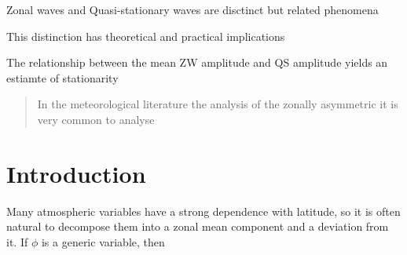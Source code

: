 \documentclass[draft,linenumbers]{agujournal2018}
\begin{document}



\begin{keypoints}
\item Zonal waves and Quasi-stationary waves are disctinct but related
phenomena
\item This distinction has theoretical and practical implications
\item The relationship between the mean ZW amplitude and QS amplitude yields
an estiamte of stationarity
\end{keypoints}

%
%


\begin{abstract}
In the meteorological literature the analysis of the zonally asymmetric
it is very common to analyse
\end{abstract}

\section{Introduction}

Many atmospheric variables have a strong dependence with latitude, so it
is often natural to decompose them into a zonal mean component and a
deviation from it. If \(\phi\) is a generic variable, then
\end{document}
